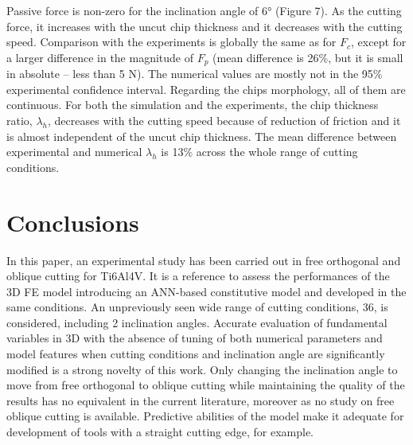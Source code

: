 \documentclass[final,5p,times,twocolumn]{elsarticle}
\begin{document}
Passive force is non-zero for the inclination angle of 6° (Figure 7). As the cutting force, it increases with the uncut chip thickness and it decreases with the cutting speed. Comparison with the experiments is globally the same as for $F_c$, except for a larger difference in the magnitude of $F_p$ (mean difference is 26\%, but it is small in absolute – less than 5 N). The numerical values are mostly not in the 95\% experimental confidence interval.
Regarding the chips morphology, all of them are continuous. For both the simulation and the experiments, the chip thickness ratio, $\lambda_h$, decreases with the cutting speed because of reduction of friction and it is almost independent of the uncut chip thickness. The mean difference between experimental and numerical $\lambda_h$ is 13\% across the whole range of cutting conditions.

\section{Conclusions}

In this paper, an experimental study has been carried out in free orthogonal and oblique cutting for Ti6Al4V. It is a reference to assess the performances of the 3D FE model introducing an ANN-based constitutive model and developed in the same conditions. An unpreviously seen wide range of cutting conditions, 36, is considered, including 2 inclination angles.
Accurate evaluation of fundamental variables in 3D with the absence of tuning of both numerical parameters and model features when cutting conditions and inclination angle are significantly modified is a strong novelty of this work. Only changing the inclination angle to move from free orthogonal to oblique cutting while maintaining the quality of the results has no equivalent in the current literature, moreover as no study on free oblique cutting is available. Predictive abilities of the model make it adequate for development of tools with a straight cutting edge, for example.

%
%
%
%


%
%
%
%


%
%
%
\end{document}

